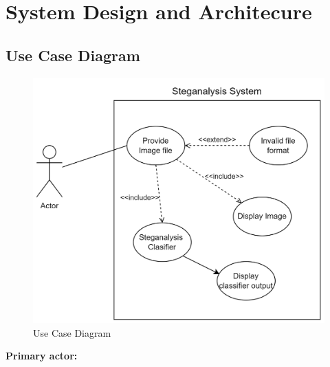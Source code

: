 \chapter{System Design and Architecure}
\section{Use Case Diagram}
\begin{figure}[H]
    \centering
    \vspace{1.5cm}
    \includegraphics[width=120mm]{./img/useCase.png}
    \caption{Use Case Diagram}
\end{figure}
\clearpage
\begin{flushleft}
    \large{\textbf{Primary actor:}}
\end{flushleft}

